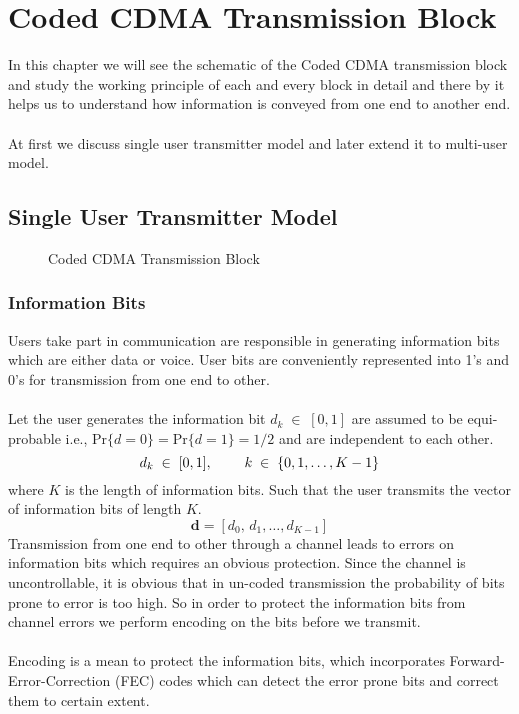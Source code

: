\chapter{Coded CDMA Transmission Block}
In this chapter we will see the schematic of the Coded CDMA transmission block and study the working principle of each and every block in detail and there by it helps us to understand how information is conveyed from one end to another end.\\ \\
At first we discuss single user transmitter model and later extend it to multi-user model.
\section{Single User Transmitter Model}
\begin{figure}[htb]
\centerline{  }
\caption{Coded CDMA Transmission Block}
\end{figure}
\subsection{Information Bits}
Users take part in communication are responsible in generating information bits which are either data or voice. User bits are conveniently represented into 1's and 0's for transmission from one end to other.\\ \\
Let the user generates the information bit $d_k\;\in\;[0,1]$ are assumed to be equi-probable i.e., $\mathrm{Pr}\{d=0\}=\mathrm{Pr}\{d=1\}=1/2$ and are independent to each other.
\begin{equation}
d_k\;\in\;[0,1],\hspace{8mm} k\;\in\;\{0,1,\dots,K-1\}
\end{equation}
where $K$ is the length of information bits. Such that the user transmits the vector of information bits of length $K$. 
\begin{equation}
\mathrm{\mathbf{d}}=[d_0,\,d_1,\dots,d_{K-1}]
\end{equation}
Transmission from one end to other through a channel leads to errors on information bits which requires an obvious protection. Since the channel is uncontrollable, it is obvious that in un-coded transmission the probability of bits prone to error is too high. So in order to protect the information bits from channel errors we perform encoding on the bits before we transmit.\\ \\
Encoding is a mean to protect the information bits, which incorporates Forward-Error-Correction (FEC) codes which can detect the error prone bits and correct them to certain extent.
